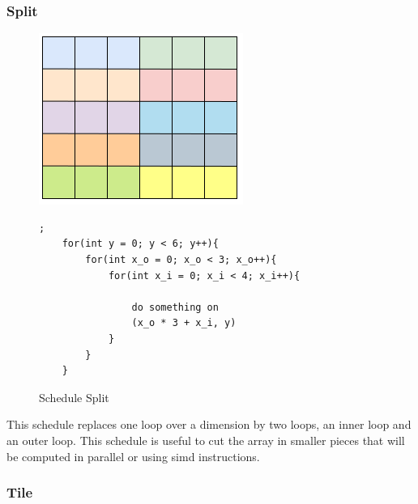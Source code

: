 \subsubsection{Split}

\begin{figure}[H]

		\begin{minipage}[c]{\EIW}
			\centering
		\includegraphics[width=\textwidth]{Images/Split.png}
		\end{minipage}
		\begin{minipage}[c]{\ECW}
			\centering
			\begin{lstlisting}[label={code:reorder}];
	for(int y = 0; y < 6; y++){
		for(int x_o = 0; x_o < 3; x_o++){
			for(int x_i = 0; x_i < 4; x_i++){

				do something on
				(x_o * 3 + x_i, y)
			}
		}
	}
\end{lstlisting}
		\end{minipage}
		\caption{Schedule Split}
\end{figure}

	This schedule replaces one loop over a dimension by two loops, an inner loop and an outer loop. This schedule is useful to cut the array in smaller pieces that will be computed in parallel or using \gls{simd} instructions.

\subsubsection{Tile}


